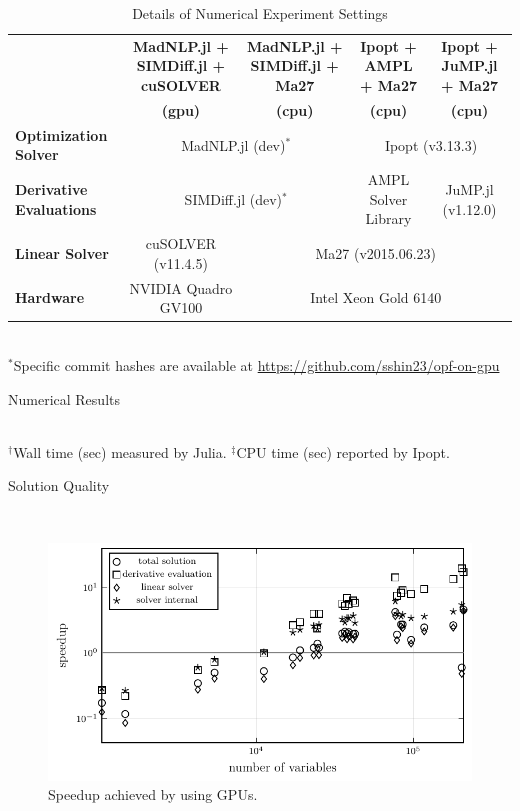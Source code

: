 \begin{table}[t]
  \scriptsize
  \centering
  \caption{Details of Numerical Experiment Settings}
  \begin{tabular}{|l|c|c|c|c|}
    \hline
    & {\textbf{MadNLP.jl + SIMDiff.jl + cuSOLVER}}
    & {\textbf{MadNLP.jl + SIMDiff.jl + Ma27}}
    & {\textbf{Ipopt + AMPL + Ma27}}
    & {\textbf{Ipopt + JuMP.jl + Ma27}}\\
    &\textbf{(gpu)} &\textbf{(cpu)} &\textbf{(cpu)}& \textbf{(cpu)}\\
    \hline
    \textbf{Optimization Solver} & \multicolumn{2}{c|}{MadNLP.jl (dev)$^*$} & \multicolumn{2}{c|}{Ipopt (v3.13.3)} \\
    \hline
    \textbf{Derivative Evaluations} & \multicolumn{2}{c|}{SIMDiff.jl (dev)$^*$} &  AMPL Solver Library & JuMP.jl (v1.12.0)\\
    \hline
    \textbf{Linear Solver} &  cuSOLVER (v11.4.5) &\multicolumn{3}{c|}{Ma27 (v2015.06.23)}\\
    \hline
    \textbf{Hardware} & NVIDIA Quadro GV100 & \multicolumn{3}{c|}{Intel Xeon Gold 6140}\\
    \hline
  \end{tabular}\\
  $^*$Specific commit hashes are available at \url{https://github.com/sshin23/opf-on-gpu}
  \label{tbl:settings}
\end{table}
\begin{table}[t]
  \scriptsize
  \centering
  \caption{Numerical Results}
  \\
  $^\dag$Wall time (sec) measured by Julia. $^\ddag$CPU time (sec) reported by Ipopt.
  \label{tbl:results}
\end{table}
\begin{table}[t]
  \scriptsize
  \centering
  \caption{Solution Quality}
  \label{tbl:quality}
  \\
\end{table}
\begin{figure}[t]
  \includegraphics[width=.45\textwidth]{speedup-sol.pdf}
  \caption{Speedup achieved by using GPUs.}
  \label{fig:speedup}
\end{figure}

